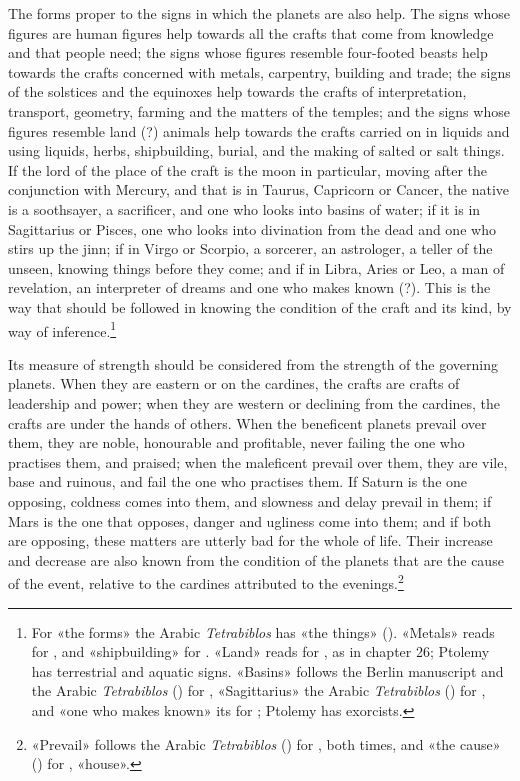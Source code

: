 \documentclass[11pt]{article}
\newcommand{\Fol}[1]{\marginpar{\footnotesize\color{gray}f.\,#1}}
\begin{document}
\par \Fol{66v}The forms proper to the signs in which the planets are also help. The signs whose figures are human figures help towards all the crafts that come from knowledge and that people need; the signs whose figures resemble four-footed beasts help towards the crafts concerned with metals, carpentry, building and trade; the signs of the solstices and the equinoxes help towards the crafts of interpretation, transport, geometry, farming and the matters of the temples; and the signs whose figures resemble land (?) animals help towards the crafts carried on in liquids and using liquids, herbs, shipbuilding, burial, and the making of salted or salt things. If the lord of the place of the craft is the moon in particular, moving after the conjunction with Mercury, and that is in Taurus, Capricorn or Cancer, the native is a soothsayer, a sacrificer, and one who looks into basins of water; if it is in Sagittarius or Pisces, one who looks into divination from the dead and one who stirs up the jinn; if in Virgo or Scorpio, a sorcerer, an astrologer, a teller of the unseen, knowing things before they come; and if in Libra, Aries or Leo, a man of revelation, an interpreter of dreams and one who makes known (?). This is the way that should be followed in knowing the condition of the craft and its kind, by way of inference.\footnote{For «the forms» the Arabic \emph{Tetrabiblos} has «the things» (). «Metals» reads  for , and «shipbuilding»  for . «Land» reads  for , as in chapter 26; Ptolemy has terrestrial and aquatic signs. «Basins» follows the Berlin manuscript and the Arabic \emph{Tetrabiblos} () for , «Sagittarius» the Arabic \emph{Tetrabiblos} () for , and «one who makes known» its  for ; Ptolemy has exorcists.}\par
\par \Fol{67r}Its measure of strength should be considered from the strength of the governing planets. When they are eastern or on the cardines, the crafts are crafts of leadership and power; when they are western or declining from the cardines, the crafts are under the hands of others. When the beneficent planets prevail over them, they are noble, honourable and profitable, never failing the one who practises them, and praised; when the maleficent prevail over them, they are vile, base and ruinous, and fail the one who practises them. If Saturn is the one opposing, coldness comes into them, and slowness and delay prevail in them; if Mars is the one that opposes, danger and ugliness come into them; and if both are opposing, these matters are utterly bad for the whole of life. Their increase and decrease are also known from the condition of the planets that are the cause of the event, relative to the cardines attributed to the evenings.\footnote{«Prevail» follows the Arabic \emph{Tetrabiblos} () for , both times, and «the cause» () for , «house».}\par
\end{document}
